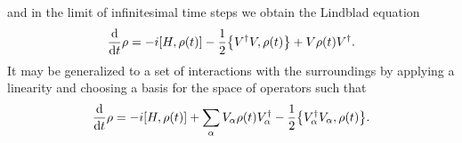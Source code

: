 and in the limit of infinitesimal time steps we obtain the Lindblad equation
\begin{align*}
	\dv{t}\rho = -i\comm{H}{\rho(t)} - \frac{1}{2}\acomm{V\adj V}{\rho(t)} + V\rho(t)V\adj.
\end{align*}
It may be generalized to a set of interactions with the surroundings by applying a linearity and choosing a basis for the space of operators such that
\begin{align*}
	\dv{t}\rho = -i\comm{H}{\rho(t)} + \sum\limits_{\alpha}V_{\alpha}\rho(t)V_{\alpha}\adj - \frac{1}{2}\acomm{V_{\alpha}\adj V_{\alpha}}{\rho(t)}.
\end{align*}